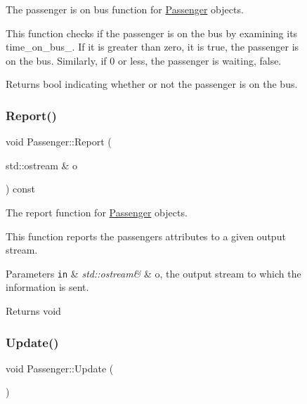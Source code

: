 \begin{figure}[H]
\begin{center}
The passenger is on bus function for \hyperlink{classPassenger}{Passenger} objects. 

This function checks if the passenger is on the bus by examining its time\+\_\+on\+\_\+bus\+\_\+. If it is greater than zero, it is true, the passenger is on the bus. Similarly, if 0 or less, the passenger is waiting, false.

\begin{DoxyReturn}{Returns}
bool indicating whether or not the passenger is on the bus. 
\end{DoxyReturn}
\mbox{\label{classPassenger_aee3f9d7f6f2a848034971559faf65248}} 
\subsubsection{\texorpdfstring{Report()}{Report()}}
{\footnotesize\ttfamily void Passenger\+::\+Report (\begin{DoxyParamCaption}\item[{std\+::ostream \&}]{o }\end{DoxyParamCaption}) const}



The report function for \hyperlink{classPassenger}{Passenger} objects. 

This function reports the passenger\textquotesingle{}s attributes to a given output stream.


\begin{DoxyParams}[1]{Parameters}
\mbox{\tt in}  & {\em std\+::ostream\&} & o, the output stream to which the information is sent.\\
\hline
\end{DoxyParams}
\begin{DoxyReturn}{Returns}
void 
\end{DoxyReturn}
\mbox{\label{classPassenger_a960de3b29fc17a2c2d79c0b79d5cf299}} 
\subsubsection{\texorpdfstring{Update()}{Update()}}
{\footnotesize\ttfamily void Passenger\+::\+Update (\begin{DoxyParamCaption}{ }\end{DoxyParamCaption})}




\end{center}
\end{figure}
